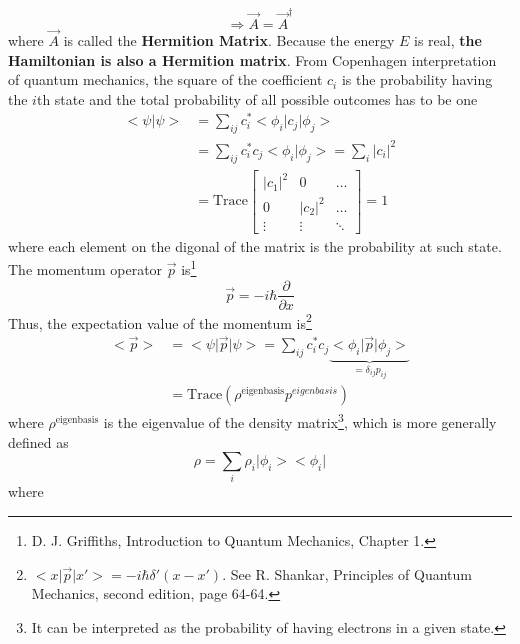 \begin{equation}
\end{equation} \begin{equation}
    \Rightarrow \vec{A} = \vec{A}^{\dagger}
\end{equation} where $\vec{A}$ is called the {\bf Hermition Matrix}. Because the energy $E$ is real, {\bf the Hamiltonian is also a Hermition matrix}. From Copenhagen interpretation of quantum mechanics, the square of the coefficient $c_{i}$ is the probability having the $i$th state and the total probability of all possible outcomes has to be one \begin{align}
    \big<\psi\big|\psi\big>& = \sum_{ij}{c_{i}^{*}\big<\phi_{i}\big|c_{j}\big|\phi_{j}\big>}\nonumber\\
    & = \sum_{ij}{c_{i}^{*}c_{j}\big<\phi_{i}\big|\phi_{j}\big>} = \sum_{i}{\big|c_{i}\big|^{2}}\nonumber\\
    & = \text{Trace}\left[\begin{matrix}
    \big|c_{1}\big|^{2} & 0 & \ldots \\
    0 & \big|c_{2}\big|^{2} & \ldots \\
    \vdots & \vdots & \ddots
    \end{matrix}
    \right] = 1
\end{align} where each element on the digonal of the matrix is the probability at such state. The momentum operator $\vec{p}$ is\footnote{D. J. Griffiths, Introduction to Quantum Mechanics, Chapter 1.} \begin{equation}
    \vec{p} = -i\hbar\frac{\partial}{\partial x}
\end{equation} Thus, the expectation value of the momentum is\footnote{$\big<x\big|\vec{p}\big|x'\big> = -i\hbar\delta'\left(x-x'\right)$. See R. Shankar, Principles of Quantum Mechanics, second edition, page 64-64.} \begin{align}
    \big<\vec{p}\big>& = \big<\psi\big|\vec{p}\big|\psi\big> = \sum_{ij}{c_{i}^{*}c_{j}\underbrace{\big<\phi_{i}\big|\vec{p}\big|\phi_{j}\big>}_{= \delta_{ij}p_{ij}}} \nonumber\\
    & = \text{Trace}\left(\rho^{\text{eigenbasis}}p^{eigenbasis}\right)
\end{align} where $\rho^{\text{eigenbasis}}$ is the eigenvalue of the density matrix\footnote{It can be interpreted as the probability of having electrons in a given state.}, which is more generally defined as \begin{equation}
    \rho = \sum_{i}{\rho_{i}\big|\phi_{i}\big>\big<\phi_{i}\big|}
\end{equation} where \begin{equation}

\end{equation}
